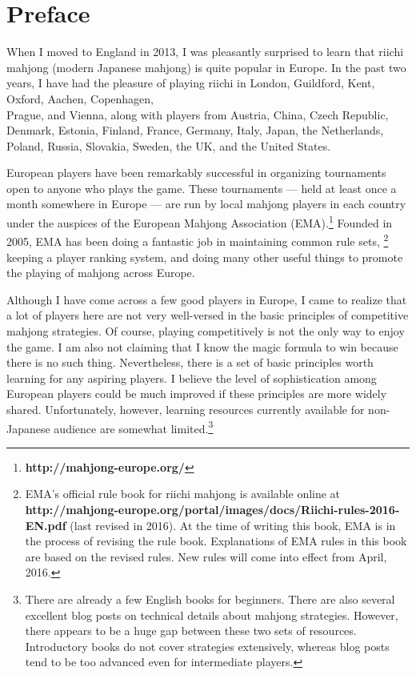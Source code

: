\chapter{Preface}
\thispagestyle{empty}

When I moved to England in 2013, I was pleasantly surprised to learn that riichi mahjong (modern Japanese mahjong) is quite popular in Europe. In the past two years, I have had the pleasure of playing riichi in London, Guildford, Kent, Oxford, Aachen, Copenhagen,\\ Prague, and Vienna, along with players from Austria, China, Czech Republic, Denmark, Estonia, Finland, France, Germany, Italy, Japan, the Netherlands, Poland, Russia, Slovakia, Sweden, the UK, and the United States. 

\bigskip
European players have been remarkably successful in organizing tournaments open to anyone who plays the game. These tournaments --- held at least once a month somewhere in Europe --- are run by local mahjong players in each country under the auspices of the European Mahjong Association (EMA).\footnote{\textbf{http://mahjong-europe.org/}} 
Founded in 2005, EMA has been doing a fantastic job in maintaining common rule sets,%
\footnote{EMA's official rule book for riichi mahjong is available online at \textbf{http://mahjong-europe.org/portal/images/docs/Riichi-rules-2016-EN.pdf} (last revised in 2016). At the time of writing this book, EMA is in the process of revising the rule book. 
Explanations of EMA rules in this book are based on the revised rules. New rules will come into effect from April, 2016.
}
keeping a player ranking system, and doing many other useful things to promote the playing of mahjong across Europe. 

\bigskip
Although I have come across a few good players in Europe, I came to realize that a lot of players here are not very well-versed in the basic principles of competitive mahjong strategies. Of course, playing competitively is not the only way to enjoy the game.
I am also not claiming that I know the magic formula to win because there is no such thing. Nevertheless, there is a set of basic principles worth learning for any aspiring players. I believe the level of sophistication among European players could be much improved if these principles are more widely shared. Unfortunately, however, learning resources currently available for non-Japanese audience are somewhat limited.\footnote{There are already a few English books for beginners. There are also several excellent blog posts on technical details about mahjong strategies. However, there appears to be a huge gap between these two sets of resources. Introductory books do not cover strategies extensively, whereas blog posts tend to be too advanced even for intermediate players.}

